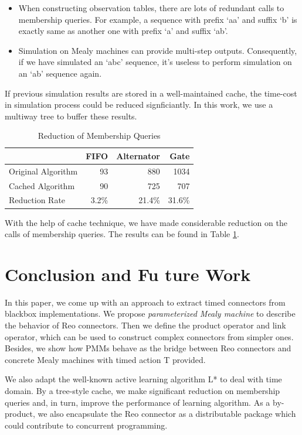 \documentclass[conference, a4paper]{IEEEtran}
\begin{document}
\begin{itemize}
  \item When constructing observation tables, there are lots of redundant calls to membership
    queries. For example, a sequence with prefix `aa' and suffix `b' is exactly same as another one
    with prefix `a' and suffix `ab'.
  \item Simulation on Mealy machines can provide multi-step outputs.  Consequently, if we have
    simulated an `abc' sequence, it's useless to perform simulation on an `ab' sequence again.
\end{itemize}

If previous simulation results are stored in a well-maintained cache, the time-cost in
simulation process could be reduced signficiantly. In this work, we use a multiway tree to buffer
these results.

\begin{table}[ht]
  \renewcommand{\arraystretch}{1.3}
  \caption{Reduction of Membership Queries}
  \label{tabel:cacheoptimization}
  \centering
  \begin{tabular}{l||rrr}
    \hline
    & FIFO & Alternator & Gate \\
    \hline\hline
    Original Algorithm & 93 & 880 & 1034 \\
    Cached Algorithm & 90 & 725 & 707 \\
    Reduction Rate & 3.2\% & 21.4\% & 31.6\% \\
    \hline
  \end{tabular}
\end{table}

With the help of cache technique, we have made considerable reduction on the calls of membership queries. The results
can be found in Table \ref{tabel:cacheoptimization}.

\section{Conclusion and Fu ture Work}
In this paper, we come up with an approach to extract timed connectors from blackbox
implementations. We propose \emph{parameterized Mealy machine} to describe the behavior of Reo
connectors. Then we define the product operator and link operator, which can be used to
construct complex connectors from simpler ones.
Besides, we show how PMMs behave as the bridge between Reo connectors and concrete Mealy
machines with timed action T provided. 

We also adapt the well-known active learning algorithm L* to deal with time domain.
By a tree-style cache, we make significant reduction on membership queries and, in turn,
improve the performance of learning algorithm. As a by-product, we also encapsulate the Reo
connector as a distributable package which could contribute to concurrent programming.
\end{document}
